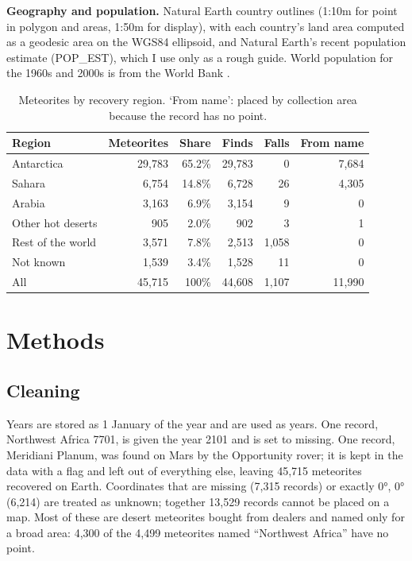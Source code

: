 \documentclass[11pt,a4paper]{article}
\begin{document}
\textbf{Geography and population.} Natural Earth \citep{naturalearth} country outlines (1:10m for point in polygon and areas, 1:50m for display), with each country's land area computed as a geodesic area on the WGS84 ellipsoid, and Natural Earth's recent population estimate (POP\_EST), which I use only as a rough guide. World population for the 1960s and 2000s is from the World Bank \citep{worldbank}.

\begin{table}[tbp]\centering\small\caption{Meteorites by recovery region. `From name': placed by collection area because the record has no point.}\label{tab:reg}\begin{tabular}{lrrrrr}\toprule Region & Meteorites & Share & Finds & Falls & From name\\\midrule
Antarctica & 29,783 & 65.2\% & 29,783 & 0 & 7,684\\
Sahara & 6,754 & 14.8\% & 6,728 & 26 & 4,305\\
Arabia & 3,163 & 6.9\% & 3,154 & 9 & 0\\
Other hot deserts & 905 & 2.0\% & 902 & 3 & 1\\
Rest of the world & 3,571 & 7.8\% & 2,513 & 1,058 & 0\\
Not known & 1,539 & 3.4\% & 1,528 & 11 & 0\\
\midrule All & 45,715 & 100\% & 44,608 & 1,107 & 11,990\\
\bottomrule\end{tabular}\end{table}

\section{Methods}
\subsection{Cleaning}
Years are stored as 1 January of the year and are used as years. One record, Northwest Africa 7701, is given the year 2101 and is set to missing. One record, Meridiani Planum, was found on Mars by the Opportunity rover; it is kept in the data with a flag and left out of everything else, leaving 45,715 meteorites recovered on Earth. Coordinates that are missing (7,315 records) or exactly 0°, 0° (6,214) are treated as unknown; together 13,529 records cannot be placed on a map. Most of these are desert meteorites bought from dealers and named only for a broad area: 4,300 of the 4,499 meteorites named ``Northwest Africa'' have no point.
\end{document}
